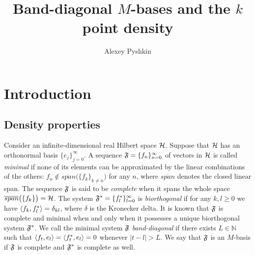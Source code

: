 \documentclass[12pt]{amsart}
\theoremstyle{case}
\begin{document}
\title{Band-diagonal $M$-bases and the $k$ point density}
\author{Alexey Pyshkin}
\begin{abstract}
\end{abstract}
\maketitle

\section{Introduction}
  \subsection{Density properties}
    Consider an infinite-dimensional real Hilbert space $\cal{H}$.
    Suppose that $\cal{H}$ has an orthonormal basis $\{e_j\}_{j=0}^\infty$.
    A sequence $\fsys=\seq{f}$ of vectors in $\cal{H}$ is called \emph{minimal} if none of its elements can be approximated by the linear combinations of the others: $f_n \notin
      \overline{span}\big(\{f_k\}_{k \ne n}\big)$ for any $n$, where $\overline{span}$ denotes the closed linear span.
    The sequence $\fsys$ is said to be \emph{complete} when it spans the whole space $\overline{span}\big(\{f_k\}\big)=\cal{H}$.
    The system $\fstarsys = \{f_l^*\}_{l=0}^\infty$ is \emph{biorthogonal} if for any $k,l \geq 0$ we have $\inner{f_k}{f^*_l} = \delta_{kl}$, where $\delta$ is the Kronecker delta.
    It is known that $\fsys$ is complete and minimal when and only when it possesses a unique biorthogonal system $\fstarsys$.
    We call the minimal system $\fsys$ \emph{band-diagonal} if there exists $L \in \mathbb{N}$ such that $\inner{f_t}{e_l} = \inner{f^*_t}{e_l} = 0$
      whenever $\lvert t - l \rvert > L$.
    We say that $\fsys$ is an $M$-basis if $\fsys$ is complete and $\fstarsys$ is complete as well.
\end{document}
